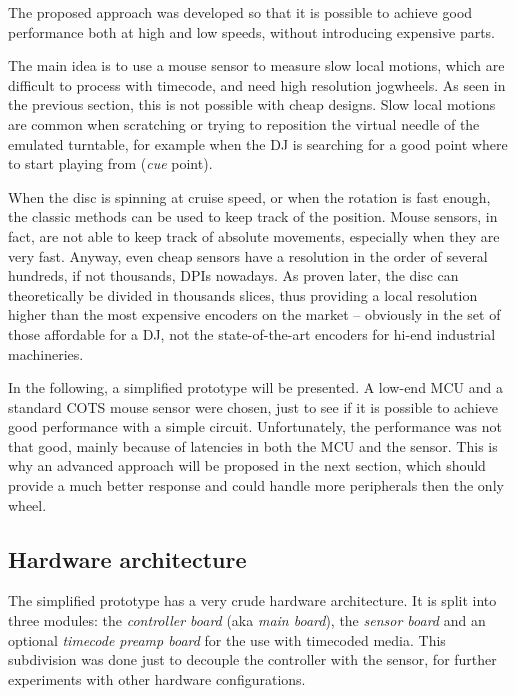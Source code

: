 \documentclass[a4paper,10pt]{article}
\begin{document}
\begin{multicols}{2}
The proposed approach was developed so that it is possible to achieve good
performance both at high and low speeds, without introducing expensive parts.

The main idea is to use a mouse sensor to measure slow local motions, which
are difficult to process with timecode, and need high resolution jogwheels.
As seen in the previous section, this is not possible with cheap designs.
Slow local motions are common when scratching or trying to reposition the
virtual needle of the emulated turntable, for example when the DJ is searching
for a good point where to start playing from (\emph{cue} point).

When the disc is spinning at cruise speed, or when the rotation is fast
enough, the classic methods can be used to keep track of the position.
Mouse sensors, in fact, are not able to keep track of absolute movements,
especially when they are very fast. Anyway, even cheap sensors have a
resolution in the order of several hundreds, if not thousands, DPIs nowadays.
As proven later, the disc can theoretically be divided in thousands slices,
thus providing a local resolution higher than the most expensive encoders on
the market -- obviously in the set of those affordable for a DJ, not the
state-of-the-art encoders for hi-end industrial machineries.

In the following, a simplified prototype will be presented. A low-end MCU and
a standard COTS mouse sensor were chosen, just to see if it is possible to
achieve good performance with a simple circuit. Unfortunately, the performance
was not that good, mainly because of latencies in both the MCU and the sensor.
This is why an advanced approach will be proposed in the next section, which
should provide a much better response and could handle more peripherals then
the only wheel.


\subsection{Hardware architecture}

The simplified prototype has a very crude hardware architecture. It is split
into three modules: the \emph{controller board} (aka \emph{main board}), the
\emph{sensor board} and an optional \emph{timecode preamp board} for the use
with timecoded media. This subdivision was done just to decouple the
controller with the sensor, for further experiments with other hardware
configurations.



\end{multicols}
\end{document}
